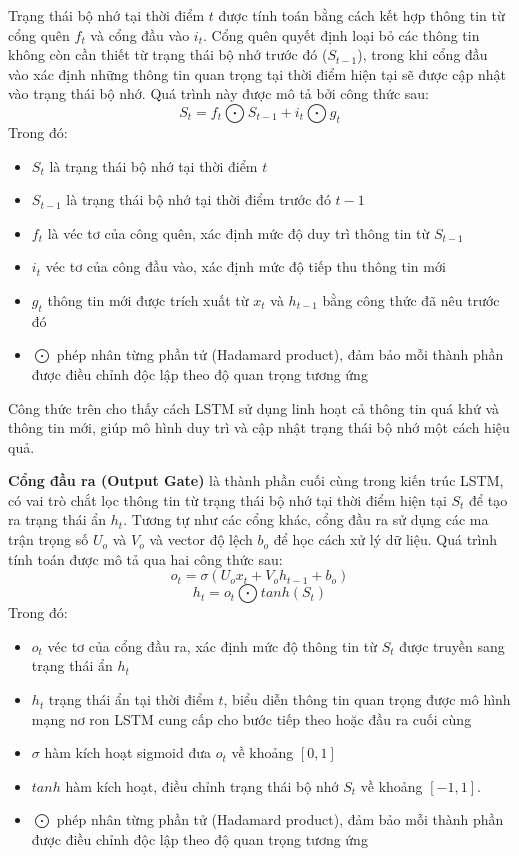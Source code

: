 Trạng thái bộ nhớ tại thời điểm $t$ được tính toán bằng cách kết hợp thông tin từ cổng quên $f_{t}$ và cổng đầu vào $i_{t}$. Cổng quên quyết định loại bỏ các thông tin không còn cần thiết từ trạng thái bộ nhớ trước đó ($S_{t-1}$), trong khi cổng đầu vào xác định những thông tin quan trọng tại thời điểm hiện tại sẽ được cập nhật vào trạng thái bộ nhớ. Quá trình này được mô tả bởi công thức sau:
\begin{equation}
    S_{t}=f_{t} \bigodot S_{t-1} + i_{t} \bigodot g_{t}
\end{equation}
Trong đó:
\begin{itemize}
    \item $S_t$ là trạng thái bộ nhớ tại thời điểm $t$
    \item $S_{t-1}$ là trạng thái bộ nhớ tại thời điểm trước đó $t-1$
    \item $f_t$ là véc tơ của công quên, xác định mức độ duy trì thông tin từ $S_{t-1}$
    \item $i_t$ véc tơ của công đầu vào, xác định mức độ tiếp thu thông tin mới
    \item $g_t$ thông tin mới được trích xuất từ $x_t$ và $h_{t-1}$ bằng công thức đã nêu trước đó
    \item $\bigodot$ phép nhân từng phần tử (Hadamard product), đảm bảo mỗi thành phần được điều chỉnh độc lập theo độ quan trọng tương ứng
\end{itemize}

Công thức trên cho thấy cách LSTM sử dụng linh hoạt cả thông tin quá khứ và thông tin mới, giúp mô hình duy trì và cập nhật trạng thái bộ nhớ một cách hiệu quả.

\textbf{Cổng đầu ra (Output Gate)} là thành phần cuối cùng trong kiến trúc LSTM, có vai trò chắt lọc thông tin từ trạng thái bộ nhớ tại thời điểm hiện tại $S_t$ để tạo ra trạng thái ẩn $h_t$. Tương tự như các cổng khác, cổng đầu ra sử dụng các ma trận trọng số $U_o$ và $V_o$ và vector độ lệch $b_o$ để học cách xử lý dữ liệu. Quá trình tính toán được mô tả qua hai công thức sau:
\begin{equation}
    o_{t} = \sigma (U_{o}x_{t}+V_{o}h_{t-1}+b_{o})
\end{equation}
\begin{equation}
    h_{t} = o_{t} \bigodot tanh(S_{t})
\end{equation}
Trong đó:
\begin{itemize}
    \item $o_t$ véc tơ của cổng đầu ra, xác định mức độ thông tin từ $S_t$ được truyền sang trạng thái ẩn $h_t$
    \item $h_t$ trạng thái ẩn tại thời điểm $t$, biểu diễn thông tin quan trọng được mô hình mạng nơ ron LSTM cung cấp cho bước tiếp theo hoặc đầu ra cuối cùng
    \item $\sigma$ hàm kích hoạt sigmoid đưa $o_t$ về khoảng $[0,1]$
    \item $tanh$ hàm kích hoạt, điều chỉnh trạng thái bộ nhớ $S_t$ về khoảng $[-1,1]$.
    \item $\bigodot$ phép nhân từng phần tử (Hadamard product), đảm bảo mỗi thành phần được điều chỉnh độc lập theo độ quan trọng tương ứng
\end{itemize}

